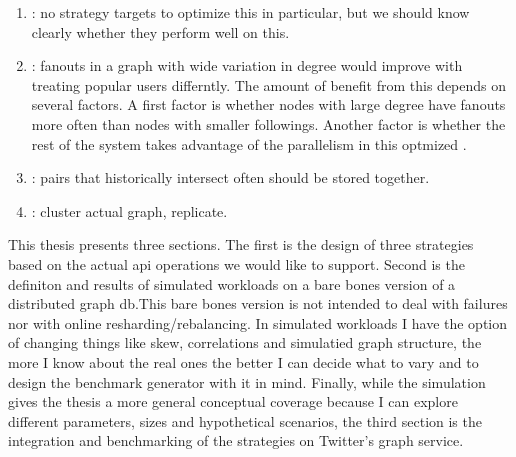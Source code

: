 \documentclass{article}
\begin{document}
\begin{enumerate}
\item \edgeq: no strategy targets to optimize this in particular, but we should know clearly whether they  perform well on this.
\item \fanoutq: fanouts in a graph with wide variation in degree would improve with treating popular users differntly. The amount of benefit from this depends on several factors. A first factor is whether nodes with large degree
have fanouts more often than nodes with smaller followings. Another factor is whether the rest of the system takes advantage of the parallelism in this optmized \fanoutq.  
\item \intersectq: pairs that historically intersect often should be stored together. 
\item \randomwalk: cluster actual graph, replicate. 
\end{enumerate}

This thesis presents three sections. The first is the design of three strategies based on the actual api operations we would like to support.  Second is the definiton and results of simulated workloads on a bare bones version of a distributed graph db.This bare bones version is not intended to deal with failures nor with online resharding/rebalancing.  In simulated workloads I have the option of changing things like skew, correlations and simulatied graph structure, the more I know about the real ones the better I can decide what to vary and to design the benchmark generator with it in mind. Finally, while the simulation gives the thesis a more general conceptual coverage because I can explore different parameters, sizes and hypothetical scenarios, the third section is the integration and benchmarking of the strategies on Twitter's graph service. 
\end{document}
